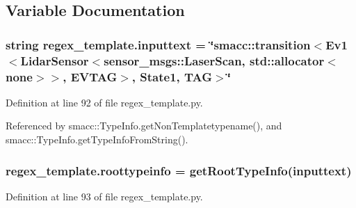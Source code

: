 \subsection{Variable Documentation}
\subsubsection[{\texorpdfstring{inputtext}{inputtext}}]{\setlength{\rightskip}{0pt plus 5cm}string regex\+\_\+template.\+inputtext = \char`\"{}smacc\+::transition$<$Ev1$<$Lidar\+Sensor$<$sensor\+\_\+msgs\+::\+Laser\+Scan, std\+::allocator$<$none$>$$>$, E\+V\+T\+AG$>$, State1, T\+AG$>$\char`\"{}}\hypertarget{namespaceregex__template_a5e23ed7a5dae7db8eb3cdae8fb3e3230}{}\label{namespaceregex__template_a5e23ed7a5dae7db8eb3cdae8fb3e3230}


Definition at line 92 of file regex\+\_\+template.\+py.



Referenced by smacc\+::\+Type\+Info.\+get\+Non\+Templatetypename(), and smacc\+::\+Type\+Info.\+get\+Type\+Info\+From\+String().

\subsubsection[{\texorpdfstring{roottypeinfo}{roottypeinfo}}]{\setlength{\rightskip}{0pt plus 5cm}regex\+\_\+template.\+roottypeinfo = {\bf get\+Root\+Type\+Info}({\bf inputtext})}\hypertarget{namespaceregex__template_a0b583a61fb8c99797bfa366fda2f86a2}{}\label{namespaceregex__template_a0b583a61fb8c99797bfa366fda2f86a2}


Definition at line 93 of file regex\+\_\+template.\+py.

